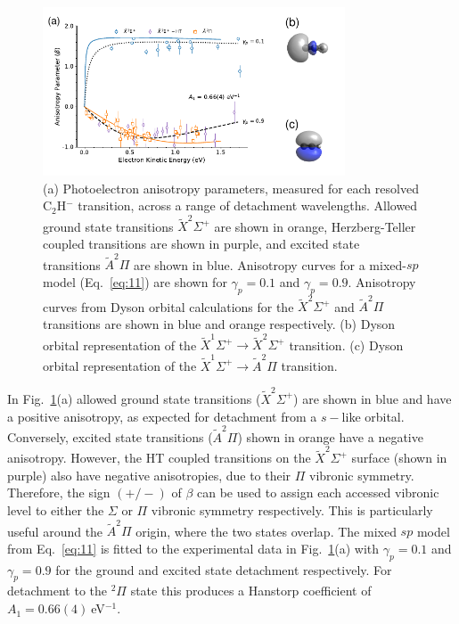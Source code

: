 \documentclass[aip,graphicx]{revtex4-1}
\begin{document}
\begin{figure}[th!]
	\includegraphics[width=0.8\textwidth]{figures/Fig5}
	\caption{(a) Photoelectron anisotropy parameters, measured for each resolved C$_2$H$^-$ transition, across a range of detachment wavelengths. Allowed ground state transitions $\tilde{X}^2\Sigma^+$ are shown in orange, Herzberg-Teller coupled transitions are shown in purple, and excited state transitions $\tilde{A} ^2\Pi$ are shown in blue. Anisotropy curves for a mixed-$sp$ model (Eq.~\ref{eq:11}) are shown for $\gamma_p=0.1$ and $\gamma_p=0.9$. Anisotropy curves from Dyson orbital calculations for the $\tilde{X}^2\Sigma^+$ and $\tilde{A} ^2\Pi$ transitions are shown in blue and orange respectively. (b) Dyson orbital representation of the $\tilde{X}^1\Sigma^+\rightarrow\tilde{X}^2\Sigma^+$ transition. (c) Dyson orbital representation of the $\tilde{X}^1\Sigma^+\rightarrow\tilde{A} ^2\Pi$ transition.}
	\label{fig:5}
\end{figure}

In Fig.~\ref{fig:5}(a) allowed ground state transitions ($\tilde{X}^2\Sigma^+$) are shown in blue and have a positive anisotropy, as expected for detachment from a $s-$like orbital. Conversely, excited state transitions ($\tilde{A} ^2\Pi$) shown in orange have a negative anisotropy. However, the HT coupled transitions on the $\tilde{X} ^2\Sigma^+$ surface (shown in purple) also have negative anisotropies, due to their $\Pi$ vibronic symmetry. Therefore, the sign $(+/-)$ of $\beta$ can be used to assign each accessed vibronic level to either the $\Sigma$ or $\Pi$ vibronic symmetry respectively. This is particularly useful around the $\tilde{A} ^2\Pi$ origin, where the two states overlap. The mixed $sp$ model from Eq.~\ref{eq:11} is fitted to the experimental data in Fig.~\ref{fig:5}(a) with $\gamma_p=0.1$ and $\gamma_p=0.9$ for the ground and excited state detachment respectively. For detachment to the $^2\Pi$ state this produces a Hanstorp coefficient of $A_1=0.66(4)~$eV$^{-1}$.
\end{document}
